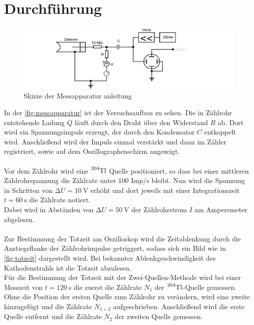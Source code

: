 \section{Durchführung}
\label{sec:Durchführung}
\begin{figure}
    \centering
    \includegraphics[width=\textwidth]{messapparatur.png}
    \caption{Skizze der Messapparatur \cite{7}{anleitung}}
    \label{fig:messapparatur}
\end{figure}
In der \autoref{fig:messapparatur} ist der Versuchsaufbau zu sehen.
Die in Zählrohr entstehende Ladung $Q$ läuft durch den Draht über den Widerstand $R$ ab.
Dort wird ein Spannungsimpuls erzeugt, der durch den Kondensator $C$ entkoppelt wird.
Anschließend wird der Impuls einmal verstärkt und dann im Zähler registriert, sowie auf dem Oszillographenschirm angezeigt.\\
\\
Vor dem Zählrohr wird eine $\ce{^{204}Tl}$ Quelle positioniert, so dass bei einer mittleren Zählrohrspannung die Zählrate unter  $\num{100}$ Imp/s bleibt.
Nun wird die Spannung in Schritten von $\increment U = \SI{10}{\volt}$ erhöht und dort jeweils mit einer Integrationszeit $t=\SI{60}{\second}$ die Zählrate notiert.\\
Dabei wird in Abständen von $\increment U = \SI{50}{\volt}$ der Zählrohrstrom $I$ am Amperemeter abgelesen.\\
\\
Zur Bestimmung der Totzeit am Oszilloskop wird die Zeitablenkung durch die Anstiegsflanke der Zählrohrimpulse getriggert, sodass sich ein Bild wie in \autoref{fig:totzeit} dargestellt wird.
Bei bekannter Ablenkgeschwindigkeit des Kathodenstrahls ist die Totzeit abzulesen. \\
Für die Bestimmung der Totzeit mit der Zwei-Quellen-Methode wird bei einer Messzeit von $t=\SI{120}{\second}$ die zuerst die Zählrate $N_1$ der $\ce{^{204}Tl}$-Quelle gemessen.
Ohne die Position der ersten Quelle zum Zählrohr zu verändern, wird eine zweite hinzugefügt und die Zählrate $N_{1+2}$ aufgeschrieben.
Anschließend wird die erste Quelle entfernt und die Zählrate $N_2$ der zweiten Quelle gemessen.
